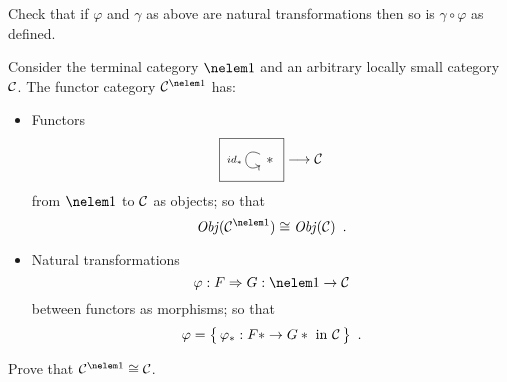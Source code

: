 \begin{exercise}
Check that if $\varphi$ and $\gamma$ as above are natural transformations then
so is $\gamma \circ \varphi$ as defined.
\end{exercise}

\begin{example}
Consider the terminal category $\nelem 1$ and an arbitrary locally small
category $\mathcal{C}$. The functor category $\lscat C^{\nelem1}$ has:
\begin{itemize}
  \item 
    Functors 
    \[
      \framebox{\begin{tikzcd}
          * \arrow[out=150,in=210, loop, looseness=5, "id_*"left]
      \end{tikzcd}}
      \longrightarrow 
      \lscat C
    \]
    from $\nelem 1$ to $\mathcal{C}$ as objects; so that 
    \[
      \Ob(\lscat C^{\nelem1})\iso\Ob(\lscat C)
      \enspace.
    \]

  \item 
    Natural transformations 
    \[
      \varphi: F \Rightarrow G: \nelem 1 \to \lscat C
    \]
    between functors as morphisms; so that
    \[
      \varphi = \big\{ \, \varphi_* : F * \to G * \text{ in } \mathcal{C} \, \big\}
      \enspace.
    \]
\end{itemize}
\end{example}

\begin{exercise}
Prove that $\lscat C^{\nelem1} \iso \lscat C$.
\end{exercise}

